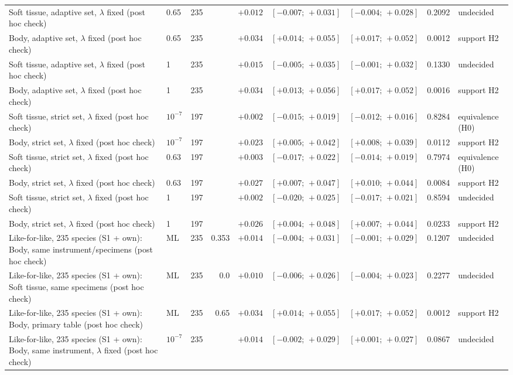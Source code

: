 \begin{table}
\begin{tabular}{@{}>{\raggedright\arraybackslash}p{10.6cm}lrrrccrl@{}}
Soft tissue, adaptive set, $\lambda$ fixed (post hoc check) & 0.65 & 235 &  & $+0.012$ & $[-0.007;\,+0.031]$ & $[-0.004;\,+0.028]$ & 0.2092 & undecided \\
Body, adaptive set, $\lambda$ fixed (post hoc check) & 0.65 & 235 &  & $+0.034$ & $[+0.014;\,+0.055]$ & $[+0.017;\,+0.052]$ & 0.0012 & support H2 \\
Soft tissue, adaptive set, $\lambda$ fixed (post hoc check) & 1 & 235 &  & $+0.015$ & $[-0.005;\,+0.035]$ & $[-0.001;\,+0.032]$ & 0.1330 & undecided \\
Body, adaptive set, $\lambda$ fixed (post hoc check) & 1 & 235 &  & $+0.034$ & $[+0.013;\,+0.056]$ & $[+0.017;\,+0.052]$ & 0.0016 & support H2 \\
Soft tissue, strict set, $\lambda$ fixed (post hoc check) & $10^{-7}$ & 197 &  & $+0.002$ & $[-0.015;\,+0.019]$ & $[-0.012;\,+0.016]$ & 0.8284 & equivalence (H0) \\
Body, strict set, $\lambda$ fixed (post hoc check) & $10^{-7}$ & 197 &  & $+0.023$ & $[+0.005;\,+0.042]$ & $[+0.008;\,+0.039]$ & 0.0112 & support H2 \\
Soft tissue, strict set, $\lambda$ fixed (post hoc check) & 0.63 & 197 &  & $+0.003$ & $[-0.017;\,+0.022]$ & $[-0.014;\,+0.019]$ & 0.7974 & equivalence (H0) \\
Body, strict set, $\lambda$ fixed (post hoc check) & 0.63 & 197 &  & $+0.027$ & $[+0.007;\,+0.047]$ & $[+0.010;\,+0.044]$ & 0.0084 & support H2 \\
Soft tissue, strict set, $\lambda$ fixed (post hoc check) & 1 & 197 &  & $+0.002$ & $[-0.020;\,+0.025]$ & $[-0.017;\,+0.021]$ & 0.8594 & undecided \\
Body, strict set, $\lambda$ fixed (post hoc check) & 1 & 197 &  & $+0.026$ & $[+0.004;\,+0.048]$ & $[+0.007;\,+0.044]$ & 0.0233 & support H2 \\
\midrule
Like-for-like, 235 species (S1 + own): Body, same instrument/specimens (post hoc check) & ML & 235 & 0.353 & $+0.014$ & $[-0.004;\,+0.031]$ & $[-0.001;\,+0.029]$ & 0.1207 & undecided \\
Like-for-like, 235 species (S1 + own): Soft tissue, same specimens (post hoc check) & ML & 235 & 0.0 & $+0.010$ & $[-0.006;\,+0.026]$ & $[-0.004;\,+0.023]$ & 0.2277 & undecided \\
Like-for-like, 235 species (S1 + own): Body, primary table (post hoc check) & ML & 235 & 0.65 & $+0.034$ & $[+0.014;\,+0.055]$ & $[+0.017;\,+0.052]$ & 0.0012 & support H2 \\
Like-for-like, 235 species (S1 + own): Body, same instrument, $\lambda$ fixed (post hoc check) & $10^{-7}$ & 235 &  & $+0.014$ & $[-0.002;\,+0.029]$ & $[+0.001;\,+0.027]$ & 0.0867 & undecided \\

\end{tabular}
\end{table}
